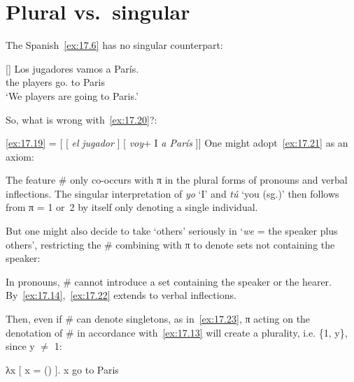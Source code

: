 \documentclass[output=paper]{langsci/langscibook}
\begin{document}
\section{Plural vs.\ singular}\label{sec:17.4}

The Spanish~\eqref{ex:17.6} has no singular counterpart:

\begin{exe}
\exi{\eqref{ex:17.6}}[]{
    \gll    Los jugadores vamos a París.\\
            the players      go.\Fpl{} to Paris\\
    \glt    ‘We players are going to Paris.’}
\label{ex:17.19}
\end{exe}
So, what is wrong with~\eqref{ex:17.20}?:

\ea\label{ex:17.20}
    \eqref{ex:17.19} = [ [ \emph{el}\tss{\#} \emph{jugador} ] [ \emph{voy}+ I\tss{\#} \emph{a París} ]]
\z
One might adopt~\eqref{ex:17.21} as an axiom:

\ea\label{ex:17.21}
    The feature \# only co-occurs with π in the plural forms of pronouns
    and verbal inflections.
\z
The singular interpretation of \emph{yo} ‘I’ and \emph{tú} ‘you (sg.)’ then
follows from π = 1 or~2 by itself only denoting a single individual.

But one might also decide to take ‘others’ seriously in ‘\emph{we} = the
speaker plus others’, restricting the \# combining with π to denote sets not
containing the speaker:

\ea\label{ex:17.22}
    In pronouns, \# cannot introduce a set containing the speaker or the hearer.
\z
By~\eqref{ex:17.14},~\eqref{ex:17.22} extends to verbal inflections.

Then, even if \# can denote singletons, as in~\eqref{ex:17.23}, π acting on
the denotation of \# in accordance with~\eqref{ex:17.13} will create a
plurality, i.e. \{1, y\}, since y ${\neq}$ 1:

\ea\label{ex:17.23}
    λx [ x = () ]. x go to Paris\\
\z
\end{document}
